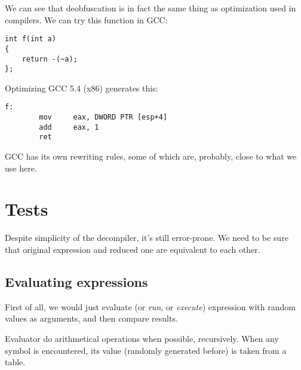 ﻿\documentclass[12pt]{article}
\begin{document}
We can see that deobfuscation is in fact the same thing as optimization used in compilers.
We can try this function in GCC:

\begin{lstlisting}
int f(int a)
{
	return -(~a);
};
\end{lstlisting}

Optimizing GCC 5.4 (x86) generates this:

\begin{lstlisting}
f:
        mov     eax, DWORD PTR [esp+4]
        add     eax, 1
        ret
\end{lstlisting}

GCC has its own rewriting rules, some of which are, probably, close to what we use here.

\section{Tests}

Despite simplicity of the decompiler, it's still error-prone.
We need to be sure that original expression and reduced one are equivalent to each other.

\subsection{Evaluating expressions}

First of all, we would just evaluate (or \textit{run}, or \textit{execute})
expression with random values as arguments, and then compare results.

Evaluator do arithmetical operations when possible, recursively.
When any symbol is encountered, its value (randomly generated before) is taken from a table.
\end{document}
